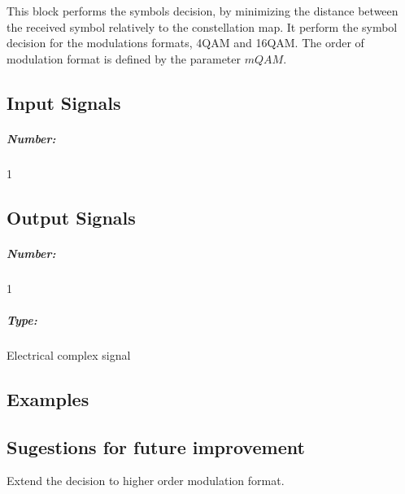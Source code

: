 This block performs the symbols decision, by minimizing the distance between the received symbol relatively to the constellation map. It perform the symbol decision for the modulations formats, 4QAM and 16QAM. The order of modulation format is defined by the parameter $mQAM$.

\pagebreak
\subsection*{Input Signals}

\subparagraph*{Number:} 1

\subsection*{Output Signals}

\subparagraph*{Number:} 1

\subparagraph*{Type:} Electrical complex signal

\subsection*{Examples}

\subsection*{Sugestions for future improvement}
Extend the decision to higher order modulation format.

